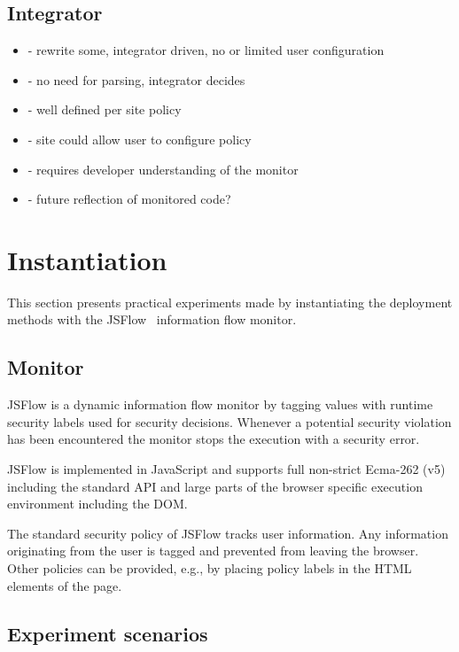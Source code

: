 \documentclass{llncs}
\begin{document}
\subsection{Integrator}

\begin{itemize}
\item- rewrite some, integrator driven, no or limited user configuration
\item- no need for parsing, integrator decides
\item- well defined per site policy
\item- site could allow user to configure policy
\item- requires developer understanding of the monitor
\item- future reflection of monitored code?
\end{itemize}


\section{Instantiation}
\label{sec:case}

This section presents practical experiments made by instantiating the deployment
methods with the JSFlow~\cite{Hedin:Sabelfeld:CSF12,JSFlow} information flow monitor. 

\subsection{Monitor}

JSFlow is a dynamic information flow monitor by tagging values with runtime
security labels used for security decisions. Whenever a potential security
violation has been encountered the monitor stops the execution with a security
error. 

JSFlow is implemented in JavaScript and supports full non-strict Ecma-262 (v5)
including the standard API and large parts of the browser specific execution
environment including the DOM.

The standard security policy of JSFlow tracks user information.  Any
information originating from the user is tagged and prevented from leaving the
browser. Other policies can be provided, e.g., by placing policy labels in the
HTML elements of the page. 


\subsection{Experiment scenarios}
\end{document}
